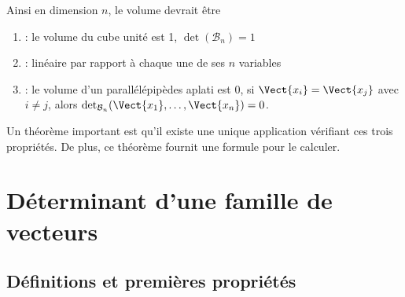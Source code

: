 \documentclass{book}
\begin{document}
\begin{Exemple}
Ainsi en dimension $n$, le volume devrait être 
\begin{enumerate}
\item {} : le volume du cube unité est 1, $\det({\mathcal{B}_n})=1$
\item {} : linéaire par rapport à chaque une de ses $n$ variables
\item {} : le volume d'un parallélépipèdes aplati est 0,  si $\Vect{x_i}=\Vect{x_j}$ avec $i\neq j$,  alors $\det_{\mathcal{B}_n}(\Vect{x_1},\dots,\Vect{x_n})=0$.
\end{enumerate}
Un théorème important est qu'il existe une unique application vérifiant ces trois propriétés. De plus, ce théorème fournit une formule pour le calculer.
  
\end{Exemple}

\section{Déterminant d'une famille de vecteurs}
\subsection{Définitions et premières propriétés}
\end{document}
